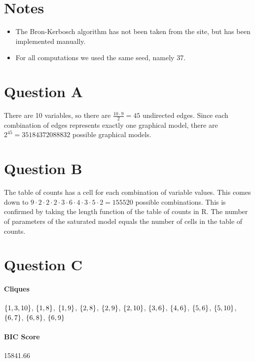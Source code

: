 \documentclass[12pt]{article}
\theoremstyle{definition}
\begin{document}
\maketitle

\section*{Notes}
\begin{itemize}
    \item The Bron-Kerbosch algorithm has not been taken from the site, but has been implemented manually.
    \item For all computations we used the same seed, namely 37.
\end{itemize}

\section*{Question A}
There are 10 variables, so there are $\frac{10 \cdot 9}{2} = 45$ undirected edges.
Since each combination of edges represents exactly one graphical model,
there are $2^{45} = 35184372088832$ possible graphical models.

\section*{Question B}
The table of counts has a cell for each combination of variable values.
This comes down to $9 \cdot 2 \cdot 2 \cdot 2 \cdot 3 \cdot 6 \cdot 4 \cdot 3 \cdot 5 \cdot 2 = 155520$ possible combinations.
This is confirmed by taking the length function of the table of counts in R.
The number of parameters of the saturated model equals the number of cells in the table of counts.

\section*{Question C}
\paragraph{Cliques}
$\set{1,3,10}$, $\set{1,8}$, $\set{1,9}$, $\set{2,8}$, $\set{2,9}$, $\set{2,10}$, $\set{3,6}$,
$\set{4,6}$, $\set{5,6}$, $\set{5,10}$, $\set{6,7}$, $\set{6,8}$, $\set{6, 9}$

\paragraph{BIC Score} 15841.66
\end{document}
